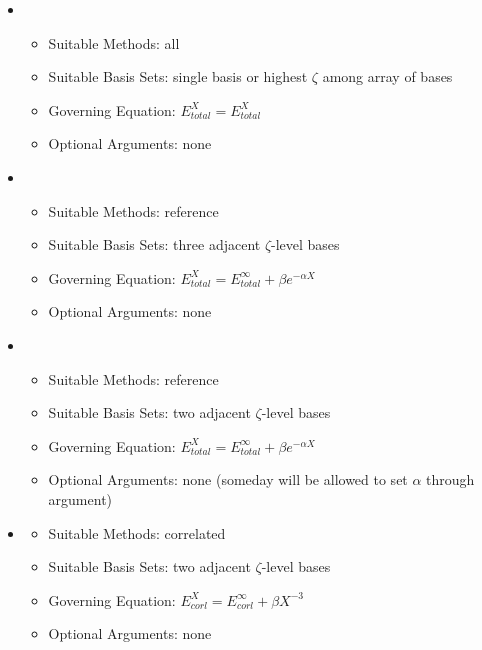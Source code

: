 
\begin{itemize}

\item {}

   \begin{itemize}
   \item[] Suitable Methods: all
   \item[] Suitable Basis Sets: single basis or highest $\zeta$ among array of bases
   \item[] Governing Equation: $E_{total}^{X} = E_{total}^{X}$
   \item[] Optional Arguments: none
   \end{itemize}

\item {}

   \begin{itemize}
   \item[] Suitable Methods: reference
   \item[] Suitable Basis Sets: three adjacent $\zeta$-level bases
   \item[] Governing Equation: $E_{total}^{X} = E_{total}^{\infty} + \beta e^{-\alpha X}$
   \item[] Optional Arguments: none
   \end{itemize}

\item {}

   \begin{itemize}
   \item[] Suitable Methods: reference
   \item[] Suitable Basis Sets: two adjacent $\zeta$-level bases
   \item[] Governing Equation: $E_{total}^{X} = E_{total}^{\infty} + \beta e^{-\alpha X}$
   \item[] Optional Arguments: none (someday will be allowed to set $\alpha$ through argument)
   \end{itemize}

\item {}\cite{Halkier:1998:CBS}

   \begin{itemize}
   \item[] Suitable Methods: correlated
   \item[] Suitable Basis Sets: two adjacent $\zeta$-level bases
   \item[] Governing Equation: $E_{corl}^{X} = E_{corl}^{\infty} + \beta X^{-3}$
   \item[] Optional Arguments: none
   \end{itemize}

\end{itemize}

